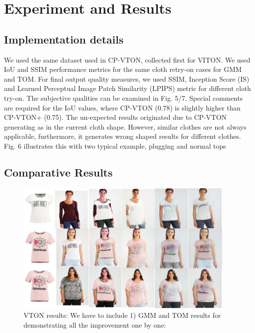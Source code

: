 
\section{Experiment and Results} 

\subsection{Implementation details} 

We used the same dataset used in CP-VTON, collected first for VITON. We used IoU and SSIM performance metrics for the same cloth retry-on cases for GMM and TOM. For final output quality measures, we used SSIM, Inception Score (IS)\cite{salimans2016improved} and Learned Perceptual Image Patch Similarity (LPIPS) metric \cite{zhang2018unreasonable} for different cloth try-on. The subjective qualities can be examined in Fig. 5/7.  Special comments are required for the IoU values, where CP-VTON (0.78) is slightly higher than CP-VTON+ (0.75). The un-expected results originated due to CP-VTON generating as in the current cloth shape. However, similar clothes are not always applicable, furthermore, it generates wrong shaped results for different clothes. Fig. 6 illustrates this with two typical example, plugging and normal tops


\subsection{Comparative Results}

\begin{figure}
\centering
\includegraphics[height=6.5cm, scale=1]{figures/cpvton+compare.png} 
\caption{VTON results: We have to include 1) GMM and TOM results for demonstrating all the improvement one by one: }
\label{fig:vtonresults}
\end{figure}

